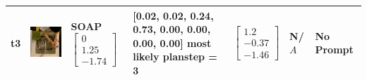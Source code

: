 \begin{longtable}{| V{0.8cm} | V{2.6cm} | V{1.6cm} | V{2.1cm} | V{1.55cm} | V{1.6cm} | V{3.2cm} |}
t3 &
\includegraphics[width=\linewidth]{fig/system/_slow2-soap_.jpg} &
SOAP
\linebreak\linebreak
$\begin{bmatrix}
0 \\
1.25 \\
-1.74
\end{bmatrix}$ &
[0.02, 0.02, 0.24, 0.73, 0.00, 0.00, 0.00, 0.00] most likely planstep = 3 &
$\begin{bmatrix}
1.2 \\
-0.37 \\
-1.46
\end{bmatrix}$ &
N/$A$ &
No Prompt
\\ \hline



\end{longtable}
